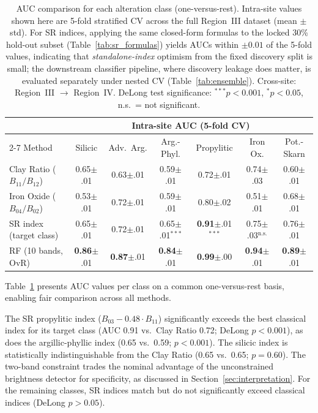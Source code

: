 \documentclass[preprint,authoryear,number]{elsarticle}
\begin{document}
\begin{table}[ht]
\centering
\caption{AUC comparison for each alteration class (one-versus-rest). Intra-site values shown here are 5-fold stratified CV across the full Region~III dataset (mean $\pm$ std). For SR indices, applying the same closed-form formulas to the locked 30\% hold-out subset (Table~\ref{tab:sr_formulas}) yields AUCs within $\pm 0.01$ of the 5-fold values, indicating that \emph{standalone-index} optimism from the fixed discovery split is small; the downstream classifier pipeline, where discovery leakage does matter, is evaluated separately under nested CV (Table~\ref{tab:ensemble}). Cross-site: Region~III $\rightarrow$ Region~IV. DeLong test significance: $^{***}p<0.001$, $^{*}p<0.05$, n.s.\ = not significant.}
\label{tab:comparison}
\begin{tabular}{lcccccc}
\toprule
 & \multicolumn{6}{c}{Intra-site AUC (5-fold CV)} \\
\cmidrule(lr){2-7}
Method & Silicic & Adv.\ Arg. & Arg.-Phyl. & Propylitic & Iron Ox. & Pot.-Skarn \\
\midrule
Clay Ratio ($B_{11}/B_{12}$) & 0.65{\tiny$\pm$.01} & 0.63{\tiny$\pm$.01} & 0.59{\tiny$\pm$.01} & 0.72{\tiny$\pm$.01} & 0.74{\tiny$\pm$.03} & 0.60{\tiny$\pm$.01} \\
Iron Oxide ($B_{04}/B_{02}$) & 0.53{\tiny$\pm$.01} & 0.72{\tiny$\pm$.01} & 0.59{\tiny$\pm$.01} & 0.80{\tiny$\pm$.02} & 0.51{\tiny$\pm$.01} & 0.68{\tiny$\pm$.01} \\
\midrule
SR index (target class) & 0.65{\tiny$\pm$.01} & 0.72{\tiny$\pm$.01} & 0.65{\tiny$\pm$.01}$^{***}$ & \textbf{0.91}{\tiny$\pm$.01}$^{***}$ & 0.75{\tiny$\pm$.03}$^{\text{n.s.}}$ & 0.76{\tiny$\pm$.01} \\
\midrule
RF (10 bands, OvR) & \textbf{0.86}{\tiny$\pm$.01} & \textbf{0.87}{\tiny$\pm$.01} & \textbf{0.84}{\tiny$\pm$.01} & \textbf{0.99}{\tiny$\pm$.00} & \textbf{0.94}{\tiny$\pm$.01} & \textbf{0.89}{\tiny$\pm$.01} \\
\bottomrule
\end{tabular}
\end{table}

Table~\ref{tab:comparison} presents AUC values per class on a common one-versus-rest basis, enabling fair comparison across all methods.

The SR propylitic index ($B_{03} - 0.48 \cdot B_{11}$) significantly exceeds the best classical index for its target class (AUC 0.91 vs.\ Clay Ratio 0.72; DeLong $p < 0.001$), as does the argillic-phyllic index (0.65 vs.\ 0.59; $p < 0.001$). The silicic index is statistically indistinguishable from the Clay Ratio (0.65 vs.\ 0.65; $p = 0.60$). The two-band constraint trades the nominal advantage of the unconstrained brightness detector for specificity, as discussed in Section~\ref{sec:interpretation}. For the remaining classes, SR indices match but do not significantly exceed classical indices (DeLong $p > 0.05$).
\end{document}
